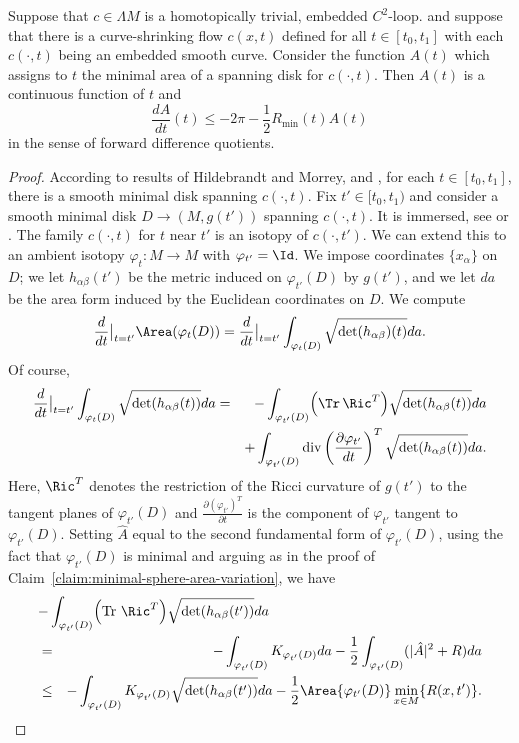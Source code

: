 \begin{lemma}
\label{lem:embedded-curve-shrinking-area-bound}
\label{embcase}
Suppose that $c\in \Lambda M$ is a homotopically trivial, embedded
$C^2$-loop. and suppose that there is a curve-shrinking flow
$c(x,t)$ defined for all $t\in [t_0,t_1]$ with each $c(\cdot,t)$
being an embedded smooth curve. Consider the function $A(t)$ which
assigns to $t$ the minimal area of a spanning disk for $c(\cdot,t)$.
Then $A(t)$ is a continuous function of $t$ and
$$\frac{dA}{dt}(t)\le -2\pi-\frac{1}{2}R_{\min}(t)A(t)$$
in the sense of forward difference quotients.
\end{lemma}


\begin{proof}
According to results of Hildebrandt and Morrey, \cite{Hildebrandt}
and \cite{Morrey}, for each $t\in [t_0,t_1]$, there is a smooth
minimal disk spanning $c(\cdot,t)$. Fix $t'\in [t_0,t_1)$ and
consider a smooth minimal disk $D\to (M,g(t'))$ spanning
$c(\cdot,t)$. It is immersed, see \cite{HardtSimon} or \cite{GL}.
The family $c(\cdot,t)$ for $t$ near $t'$ is an isotopy of
$c(\cdot,t')$. We can extend this to an ambient isotopy
$\varphi_t\colon M\to M$ with $\varphi_{t'}=\Id$. We impose
coordinates $\{x_\alpha\}$ on $D$; we let $h_{\alpha\beta}(t')$ be
the metric induced  on $\varphi_{t'}(D)$ by $g(t')$, and we let $da$
be the area form induced by the Euclidean coordinates on $D$. We
compute
$$\frac{d}{dt}\bigl|_{t=t'}\bigr.\Area(\varphi_t(D))
=\frac{d}{dt}\bigl|_{t=t'}\bigr.\int_{\varphi_t(D)}\sqrt{\mathrm{det}(h_{\alpha\beta})(t)}da.$$ Of course,
\begin{eqnarray*}
\frac{d}{dt}\bigl|_{t=t'}\bigr.\int_{\varphi_t(D)}\sqrt{\mathrm{det}(h_{\alpha\beta}(t))}da & = & -\int_{\varphi_{t'}(D)}\Bigl(\Tr\,\Ric^T\Bigr)\sqrt{\det(h_{\alpha\beta}(t))}da \\
& & +\int_{\varphi_{t'}(D)}\operatorname{div}\left(\frac{\partial
\varphi_{t'}}{dt}\right)^T\sqrt{\det(h_{\alpha\beta}(t))}da.
\end{eqnarray*}
 Here, $\Ric^T$
denotes the restriction of the Ricci curvature of $g(t')$ to the
tangent planes of $\varphi_{t'}(D)$ and
$\frac{\partial(\varphi_{t'})^T}{\partial t}$ is the component of
$\varphi_{t'}$ tangent to $\varphi_{t'}(D)$. Setting $\hat A$ equal
to the second fundamental form of $\varphi_{t'}(D)$, using the fact
that $\varphi_{t'}(D)$ is minimal and arguing as in the proof of
Claim~\ref{claim:minimal-sphere-area-variation}, we have
\begin{eqnarray*}
\lefteqn{-\int_{\varphi_{t'}(D)}\Bigl(\operatorname{Tr}\,\Ric^T\Bigr)\sqrt{\det(h_{\alpha\beta}(t'))}da } \\
 & = &
-\int_{\varphi_{t'}(D)}K_{\varphi_{t'}(D)}da
-\frac{1}{2}\int_{\varphi_{t'}(D)}(|\hat A|^2+R)da \\
& \le & -\int_{\varphi_{t'}(D)}K_{\varphi_{t'}(D)}\sqrt{\mathrm{det}(h_{\alpha\beta}(t'))}da-\frac{1}{2}\Area{\varphi_{t'}(D)}\min_{x\in M}\{R(x,t')\}.
 \end{eqnarray*}


\end{proof}

